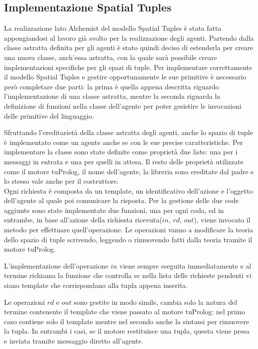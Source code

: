 \subsection{Implementazione Spatial Tuples}
La realizzazione lato Alchemist del modello Spatial Tuples è stata fatta appongiandosi al lavoro già svolto per la realizzazione degli agenti. Partendo dalla classe astratta definita per gli agenti è stato quindi deciso di estenderla per creare una nuova classe, anch'essa astratta, con la quale sarà possibile creare implementazioni specifiche per gli spazi di tuple. Per implementare correttamente il modello Spatial Tuples e gestire opportunamente le sue primitive è necessario però completare due parti: la prima è quella appena descritta riguardo l'implementazione di una classe astratta, mentre la seconda riguarda la definizione di funzioni nella classe dell'agente per poter gesistire le invocazioni delle primitive del linguaggio.

Sfruttando l'ereditarietà della classe astratta degli agenti, anche lo spazio di tuple è implementato come un agente anche se con le sue precise caratteristiche. Per implementare la classe sono state definite come proprietà due liste: una per i messaggi in entrata e una per quelli in attesa. Il resto delle proprietà utilizzate come il motore tuProlog, il nome dell'agente, la libreria sono ereditate dal padre e lo stesso vale anche per il costruttore.
\\
Ogni richiesta è composta da un template, un identificativo dell'azione e l'oggetto dell'agente al quale poi comunicare la risposta. 
Per la gestione delle due code aggiunte sono state implementate due funzioni, una per ogni coda, ed in entrambe, in base all'azione della richiesta ricevuta($in$, $rd$, $out$), viene invocato il metodo per effettuare quell'operazione. Le operazioni vanno a modificare la teoria dello spazio di tuple scrivendo, leggendo o rimuovendo fatti dalla teoria tramite il motore tuProlog.

L'implementazione dell'operazione $in$ viene sempre eseguita immediatamente e al termine richiama la funzione che controlla se nella lista delle richieste pendenti vi siano template che corrispondano alla tupla appena inserita.

Le operazioni $rd$ e $out$ sono gestite in modo simile, cambia solo la natura del termine contenente il template che viene passato al motore tuProlog: nel primo caso contiene solo il template mentre nel secondo anche la sintassi per rimuovere la tupla. In entrambi i casi, se il motore restituisce una tupla, questa viene presa e inviata tramite messaggio diretto all'agente.

